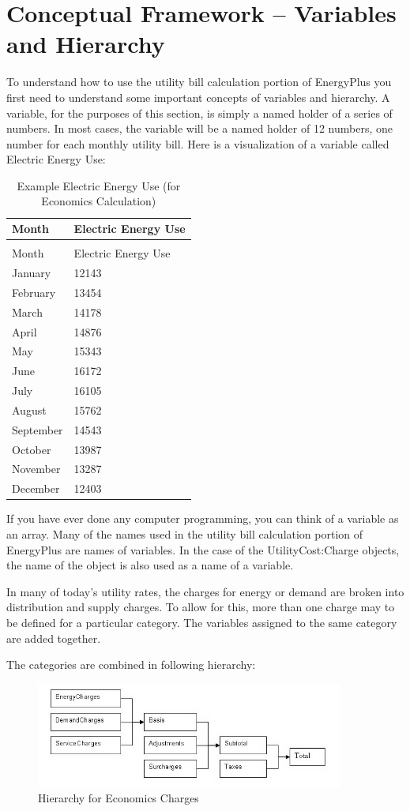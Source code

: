 \section{Conceptual Framework -- Variables and Hierarchy}\label{conceptual-framework-variables-and-hierarchy}

To understand how to use the utility bill calculation portion of EnergyPlus you first need to understand some important concepts of variables and hierarchy. A variable, for the purposes of this section, is simply a named holder of a series of numbers. In most cases, the variable will be a named holder of 12 numbers, one number for each monthly utility bill. Here is a visualization of a variable called Electric Energy Use:

\begin{longtable}[c]{@{}ll@{}}
\caption{Example Electric Energy Use (for Economics Calculation) \label{table:example-electric-energy-use-for-economics}} \tabularnewline
\toprule 
Month & Electric Energy Use \tabularnewline
\midrule
\endfirsthead

\caption[]{Example Electric Energy Use (for Economics Calculation)} \tabularnewline
\toprule 
Month & Electric Energy Use \tabularnewline
\midrule
\endhead

January & 12143 \tabularnewline
February & 13454 \tabularnewline
March & 14178 \tabularnewline
April & 14876 \tabularnewline
May & 15343 \tabularnewline
June & 16172 \tabularnewline
July & 16105 \tabularnewline
August & 15762 \tabularnewline
September & 14543 \tabularnewline
October & 13987 \tabularnewline
November & 13287 \tabularnewline
December & 12403 \tabularnewline
\bottomrule
\end{longtable}

If you have ever done any computer programming, you can think of a variable as an array. Many of the names used in the utility bill calculation portion of EnergyPlus are names of variables. In the case of the UtilityCost:Charge objects, the name of the object is also used as a name of a variable.

In many of today's utility rates, the charges for energy or demand are broken into distribution and supply charges. To allow for this, more than one charge may to be defined for a particular category. The variables assigned to the same category are added together.

The categories are combined in following hierarchy:

\begin{figure}[hbtp] %
\centering
\includegraphics[width=0.9\textwidth, height=0.9\textheight, keepaspectratio=true]{media/image615.png}
\caption{Hierarchy for Economics Charges \protect \label{fig:hierarchy-for-economics-charges}}
\end{figure}

